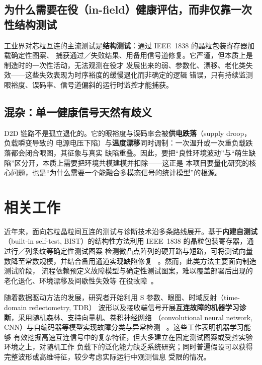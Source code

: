 \documentclass[11pt,a4paper,fontset=mac]{ctexart}
\newcommand{\term}[1]{\textbf{#1}}
\begin{document}
\subsection{为什么需要在役（in-field）健康评估，而非仅靠一次性结构测试}
工业界对芯粒互连的主流测试是\term{结构测试}：通过 IEEE~1838 的晶粒包装寄存器加载确定性图案、
捕获通过／失败结果、用备用信号道修复。它严谨，但本质上是制造时的一次性活动，无法观测在役才
发展出来的弱、参数化、漂移、老化类失效——这些失效表现为时序裕度的缓慢退化而非确定的逻辑
错误，只有持续监测眼裕度、误码率、信号道偏斜的运行时监控才能捕获。

\subsection{混杂：单一健康信号天然有歧义}
D2D 链路不是孤立退化的。它的眼裕度与误码率会被\term{供电跌落}（supply droop，负载瞬变导致的
电源电压下陷）与\term{温度漂移}同时调制：一次温升或一次重负载跌落都会闭合眼图，其征象与真实
缺陷重叠。因此，要把“良性环境波动”与“萌生缺陷”区分开，本质上需要把环境共模建模并扣除——这正是
本项目要量化研究的核心问题，也是“为什么需要一个能融合多模态信号的统计模型”的根源。

\section{相关工作}\label{sec:related}

近年来，面向芯粒晶粒间互连的测试与诊断技术沿多条路线展开。基于\textbf{内建自测试}（built-in
self-test, BIST）的结构性方法利用 IEEE~1838 的晶粒包装寄存器，通过行／列条纹等确定性测试图案
检测微凸点阵列的硬开路与短路，可将测试向量数降至常数规模，并结合备用通道实现缺陷修复
~\cite{huang2024bist,chuang2025pattern,wang2024ucie}。然而，此类方法主要面向制造测试阶段，
流程依赖预定义故障模型与确定性测试图案，难以覆盖部署后出现的老化退化、环境漂移及间歇性失效等
在役故障~\cite{cui2023physical}。

随着数据驱动方法的发展，研究者开始利用 S 参数、眼图、时域反射（time-domain reflectometry, TDR）
波形以及接收端信号开展\textbf{互连故障的机器学习诊断}，采用随机森林、支持向量机、卷积神经网络
（convolutional neural network, CNN）与自编码器等模型实现故障分类与异常检测
~\cite{huang2018tsv,kang2023reflection,medico2018ae,usama2026latent}。这些工作表明机器学习能够
有效挖掘高速互连信号中的复杂特征，但大多建立在固定测试图案或受控实验环境之上，对随机工作
负载下的泛化能力缺乏系统研究；同时普遍假设可以获得完整波形或高维特征，较少考虑实际运行中观测信息
受限的情况。
\end{document}
